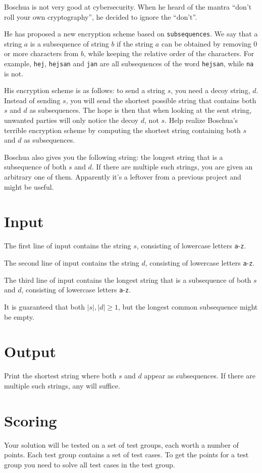 \noindent
Boschua is not very good at cybersecurity. When he heard of the mantra ``don't roll your own cryptography'', he
decided to ignore the ``don't''.

He has proposed a new encryption scheme based on \texttt{subsequences}. We say that a string $a$ is a subsequence
of string $b$ if the string $a$ can be obtained by removing $0$ or more characters from $b$, while keeping the
relative order of the characters. For example, \texttt{hej}, \texttt{hejsan} and \texttt{jan} are all subsequences of the word
\texttt{hejsan}, while \texttt{na} is not. 

His encryption scheme is as follows: to send a string $s$, you need a decoy string, $d$. Instead of sending $s$,
you will send the shortest possible string that contains both $s$ and $d$ as subsequences. The hope is then that when
looking at the sent string, unwanted parties will only notice the decoy $d$, not $s$. Help realize Boschua's
terrible encryption scheme by computing the shortest string containing both $s$ and $d$ as subsequences.

Boschua also gives you the following string: the longest string that is a subsequence of both $s$ and $d$.
If there are multiple such strings, you are given an arbitrary one of them.
Apparently it's a leftover from a previous project and might be useful.

\section*{Input}
The first line of input contains the string $s$, consisting of lowercase letters \texttt{a}-\texttt{z}.

The second line of input contains the string $d$, consisting of lowercase letters \texttt{a}-\texttt{z}.

The third line of input contains the longest string that is a subsequence of both $s$ and $d$,
consisting of lowercase letters \texttt{a}-\texttt{z}.

It is guaranteed that both $|s|, |d| \geq 1$, but the longest common subsequence might be empty.

\section*{Output}
Print the shortest string where both $s$ and $d$ appear as subsequences. If there are multiple such strings, any will suffice.

\section*{Scoring}
Your solution will be tested on a set of test groups, each worth a number of points. Each test group contains
a set of test cases. To get the points for a test group you need to solve all test cases in the test group.

